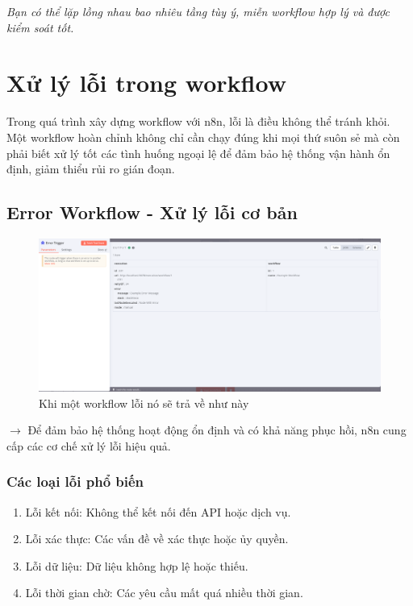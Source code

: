 \textit{Bạn có thể lặp lồng nhau bao nhiêu tầng tùy ý, miễn workflow hợp lý và được kiểm soát tốt.}

\newpage
\section{Xử lý lỗi trong workflow}
Trong quá trình xây dựng workflow với n8n, lỗi là điều không thể tránh khỏi. Một workflow hoàn chỉnh không chỉ cần chạy đúng khi mọi thứ suôn sẻ mà còn phải biết xử lý tốt các tình huống ngoại lệ để đảm bảo hệ thống vận hành ổn định, giảm thiểu rủi ro gián đoạn.
\subsection{Error Workflow - Xử lý lỗi cơ bản}
\begin{figure}[htbp]
    \centering
    \includegraphics[width=1\linewidth]{Chap1-7/error_event.pdf}
    \caption{Khi một workflow lỗi nó sẽ trả về như này}
\end{figure}

$\rightarrow$ Để đảm bảo hệ thống hoạt động ổn định và có khả năng phục hồi, n8n cung cấp các cơ chế xử lý lỗi hiệu quả.

\subsubsection{Các loại lỗi phổ biến}

\begin{enumerate}
  \item Lỗi kết nối: Không thể kết nối đến API hoặc dịch vụ.
  \item Lỗi xác thực: Các vấn đề về xác thực hoặc ủy quyền.
  \item Lỗi dữ liệu: Dữ liệu không hợp lệ hoặc thiếu.
  \item Lỗi thời gian chờ: Các yêu cầu mất quá nhiều thời gian.
\end{enumerate}

